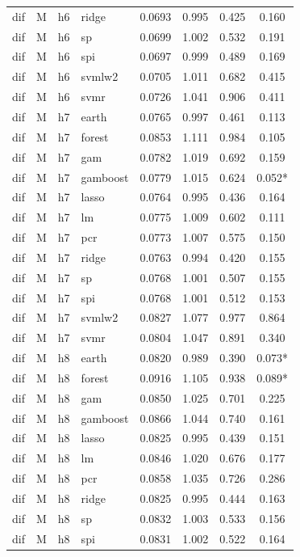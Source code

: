 \begin{ThreePartTable}
\begin{longtable}[t]{llclcccc}
dif & M & h6 & ridge & 0.0693 & 0.995 & 0.425 & 0.160\\
dif & M & h6 & sp & 0.0699 & 1.002 & 0.532 & 0.191\\
dif & M & h6 & spi & 0.0697 & 0.999 & 0.489 & 0.169\\
dif & M & h6 & svmlw2 & 0.0705 & 1.011 & 0.682 & 0.415\\
dif & M & h6 & svmr & 0.0726 & 1.041 & 0.906 & 0.411\\
\addlinespace
dif & M & h7 & earth & 0.0765 & 0.997 & 0.461 & 0.113\\
dif & M & h7 & forest & 0.0853 & 1.111 & 0.984 & 0.105\\
dif & M & h7 & gam & 0.0782 & 1.019 & 0.692 & 0.159\\
dif & M & h7 & gamboost & 0.0779 & 1.015 & 0.624 & 0.052*\\
dif & M & h7 & lasso & 0.0764 & 0.995 & 0.436 & 0.164\\
dif & M & h7 & lm & 0.0775 & 1.009 & 0.602 & 0.111\\
dif & M & h7 & pcr & 0.0773 & 1.007 & 0.575 & 0.150\\
dif & M & h7 & ridge & 0.0763 & 0.994 & 0.420 & 0.155\\
dif & M & h7 & sp & 0.0768 & 1.001 & 0.507 & 0.155\\
dif & M & h7 & spi & 0.0768 & 1.001 & 0.512 & 0.153\\
dif & M & h7 & svmlw2 & 0.0827 & 1.077 & 0.977 & 0.864\\
dif & M & h7 & svmr & 0.0804 & 1.047 & 0.891 & 0.340\\
\addlinespace
dif & M & h8 & earth & 0.0820 & 0.989 & 0.390 & 0.073*\\
dif & M & h8 & forest & 0.0916 & 1.105 & 0.938 & 0.089*\\
dif & M & h8 & gam & 0.0850 & 1.025 & 0.701 & 0.225\\
dif & M & h8 & gamboost & 0.0866 & 1.044 & 0.740 & 0.161\\
dif & M & h8 & lasso & 0.0825 & 0.995 & 0.439 & 0.151\\
dif & M & h8 & lm & 0.0846 & 1.020 & 0.676 & 0.177\\
dif & M & h8 & pcr & 0.0858 & 1.035 & 0.726 & 0.286\\
dif & M & h8 & ridge & 0.0825 & 0.995 & 0.444 & 0.163\\
dif & M & h8 & sp & 0.0832 & 1.003 & 0.533 & 0.156\\
dif & M & h8 & spi & 0.0831 & 1.002 & 0.522 & 0.164\\

\end{longtable}
\end{ThreePartTable}
